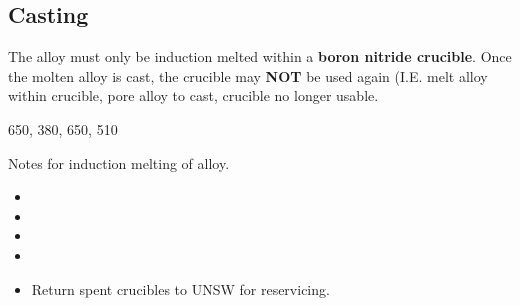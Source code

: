 \subsection{Casting}

The \MgZnCa alloy must only be induction melted within a \textbf{boron nitride crucible}. Once the molten alloy is cast, the crucible may \textbf{NOT} be used again (I.E. melt alloy within crucible, pore alloy to cast, crucible no longer usable. 

650, 380, 650, 510

Notes for induction melting of \MgZnCa alloy.
\begin{itemize}
\item 
\item 
\item 
\item
\item Return spent crucibles to UNSW for reservicing. 
\end{itemize}